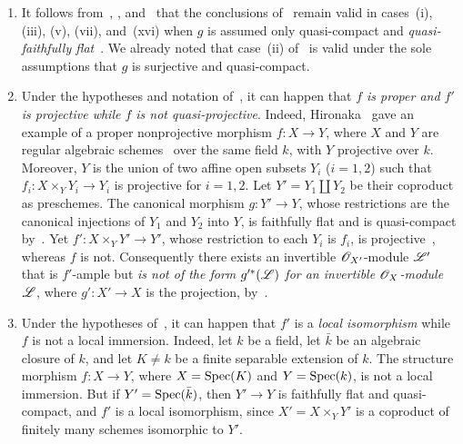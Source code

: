 \begin{remarks}[2.7.3]
\label{IV.2.7.3}
\begin{enumerate}
  \item[(i)] It follows from~, ,
  and~ that the conclusions of~
  remain valid in cases~(i), (iii), (v), (vii), and~(xvi) when $g$ is
  assumed only quasi-compact and \emph{quasi-faithfully
  flat}~. We already noted that case~(ii)
  of~ is valid under the sole assumptions that $g$ is
  surjective and quasi-compact.

  \item[(ii)] Under the hypotheses and notation of~,
  it can happen that \emph{$f$ is proper and $f'$ is projective while $f$ is
  not quasi-projective}. Indeed, Hironaka~\cite{IV-34} gave an example
  of a proper nonprojective morphism $f:X\to Y$, where $X$ and $Y$ are
  regular algebraic schemes~ over the same field
  $k$, with $Y$ projective over $k$. Moreover, $Y$ is the union of two
  affine open subsets $Y_i$ \textnormal{(}$i=1,2$\textnormal{)} such
  that $f_i:X\times_Y Y_i\longrightarrow Y_i$
  is projective for $i=1,2$. Let $Y'=Y_1\amalg Y_2$ be their
  coproduct as preschemes. The canonical morphism $g:Y'\to Y$, whose
  restrictions are the canonical injections of $Y_1$ and $Y_2$ into
  $Y$, is faithfully flat and is quasi-compact by~.
  Yet $f':X\times_Y Y'\to Y'$, whose restriction to each $Y_i$ is
  $f_i$, is projective~, whereas $f$ is not.
  Consequently there exists an invertible $\mathscr{O}_{X'}$-module
  $\mathscr{L}'$ that is $f'$-ample but \emph{is not of the form
  $g'^*(\mathscr{L})$ for an invertible $\mathscr{O}_X$-module $\mathscr{L}$}, where
  $g':X'\to X$ is the projection, by~.

  \item[(iii)] Under the hypotheses of~, it can happen
  that $f'$ is a \emph{local isomorphism} while $f$ is not a local immersion.
  Indeed, let $k$ be a field, let $\bar{k}$ be an algebraic closure of
  $k$, and let $K\neq k$ be a finite separable extension of $k$. The
  structure morphism $f:X\to Y$, where $X=\operatorname{Spec}(K)$ and
  $Y=\operatorname{Spec}(k)$, is not a local immersion. But if
  $Y'=\operatorname{Spec}(\bar{k})$, then $Y'\to Y$ is faithfully flat and
  quasi-compact, and $f'$ is a local isomorphism, since
  $X'=X\times_Y Y'$ is a coproduct of finitely many schemes isomorphic
  to $Y'$.
\end{enumerate}
\end{remarks}

